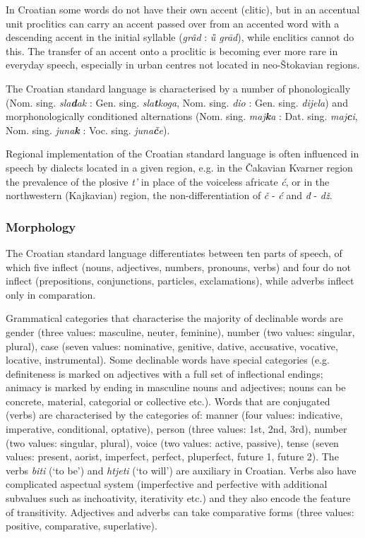 \begin{multicols}{2}
In Croatian some words do not have their own accent (clitic), but in an accentual unit proclitics can carry an accent passed over from an accented word with a descending accent in the initial syllable (\emph{grâd} : \emph{ȕ grād}), while enclitics cannot do this. The transfer of an accent onto a proclitic is becoming ever more rare in everyday speech, especially in urban centres not located in neo-Štokavian regions.

The Croatian standard language is characterised by a number of phonologically (Nom. sing. \emph{sla\textbf{d}ak} : Gen. sing. \emph{sla\textbf{t}koga}, Nom. sing. \emph{dio} : Gen. sing. \emph{dijela}) and morphonologically conditioned alternations (Nom. sing. \emph{maj\textbf{k}a} : Dat. sing. \emph{maj\textbf{c}i}, Nom. sing. \emph{juna\textbf{k}} : Voc. sing. \emph{juna\textbf{č}e}).

Regional implementation of the Croatian standard language is often influenced in speech by dialects located in a given region, e.g. in the Čakavian Kvarner region the prevalence of the plosive \emph{t'} in place of the voiceless africate \emph{ć}, or in the northwestern (Kajkavian) region, the non-differentiation of \emph{č} - \emph{ć} and \emph{đ} - \emph{dž}. 


\subsubsection{Morphology}

The Croatian standard language differentiates between ten parts of speech, of which five inflect (nouns, adjectives, numbers, pronouns, verbs) and four do not inflect (prepositions, conjunctions, particles, exclamations), while adverbs inflect only in comparation.

Grammatical categories that characterise the majority of declinable words are gender (three values: masculine, neuter, feminine), number (two values: singular, plural), case (seven values: nominative, genitive, dative, accusative, vocative, locative, instrumental). Some declinable words have special categories (e.g. definiteness is marked on adjectives with a full set of inflectional endings; animacy is marked by ending in masculine nouns and adjectives; nouns can be concrete, material, categorial or collective etc.). Words that are conjugated (verbs) are characterised by the categories of: manner (four values: indicative, imperative, conditional, optative), person (three values: 1st, 2nd, 3rd), number (two values: singular, plural), voice (two values: active, passive), tense (seven values: present, aorist, imperfect, perfect, pluperfect, future 1, future 2). The verbs \emph{biti} (‘to be’) and \emph{htjeti} (‘to will’) are auxiliary in Croatian. Verbs also have complicated aspectual system (imperfective and perfective with additional subvalues such as inchoativity, iterativity etc.) and they also encode the feature of transitivity. Adjectives and adverbs can take comparative forms (three values: positive, comparative, superlative).


\end{multicols}
